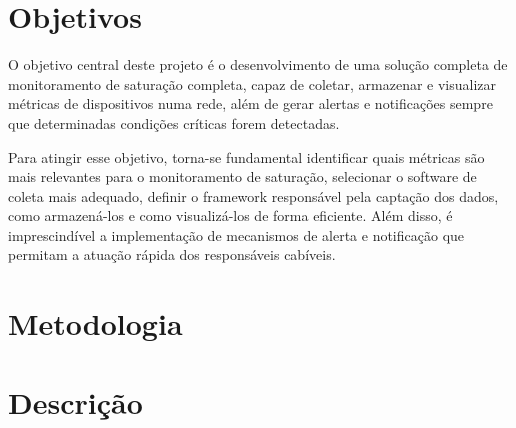 \section{Objetivos}

O objetivo central deste projeto é o desenvolvimento de uma solução completa de monitoramento de saturação completa, capaz de coletar, armazenar e visualizar métricas de dispositivos numa rede, além de gerar alertas e notificações sempre que determinadas condições críticas forem detectadas.

Para atingir esse objetivo, torna-se fundamental identificar quais métricas são mais relevantes para o monitoramento de saturação, selecionar o software de coleta mais adequado, definir o framework responsável pela captação dos dados, como armazená-los e como visualizá-los de forma eficiente. Além disso, é imprescindível a implementação de mecanismos de alerta e notificação que permitam a atuação rápida dos responsáveis cabíveis.

\section{Metodologia}



\section{Descrição}